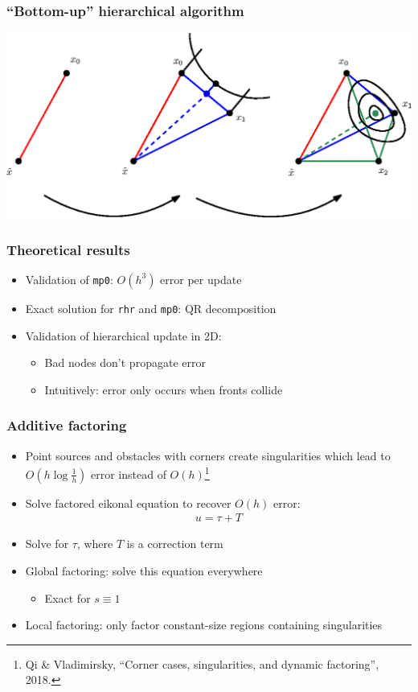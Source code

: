 \documentclass{beamer}
\begin{document}
\begin{frame}
  \frametitle{``Bottom-up'' hierarchical algorithm}
  \centering
  \includegraphics[width=\linewidth]{hierarchical-updates.eps}
\end{frame}

\begin{frame}
  \frametitle{Theoretical results}
  \begin{itemize}
  \item Validation of \texttt{mp0}: $O(h^3)$ error per update \pause
  \item Exact solution for \texttt{rhr} and \texttt{mp0}: QR decomposition \pause
  \item Validation of hierarchical update in 2D\pause:
    \begin{itemize}
    \item Bad nodes don't propagate error \pause
    \item Intuitively: error only occurs when fronts collide
    \end{itemize}
  \end{itemize}
\end{frame}

\begin{frame}
  \frametitle{Additive factoring}
  \begin{itemize}
  \item Point sources and obstacles with corners create singularities
    which lead to $O(h \log \tfrac{1}{h})$ error instead of
    $O(h)$\footnote{Qi \& Vladimirsky, ``Corner cases, singularities,
      and dynamic factoring'', 2018.} \pause
  \item Solve factored eikonal equation to recover $O(h)$ error:
    \begin{align*}
      u = \tau + T
    \end{align*} \pause
  \item Solve for $\tau$, where $T$ is a correction term \pause
  \item Global factoring: solve this equation everywhere
    \begin{itemize}
    \item Exact for $s \equiv 1$
    \end{itemize} \pause
  \item Local factoring: only factor constant-size regions containing singularities
  \end{itemize}
\end{frame}
\end{document}
